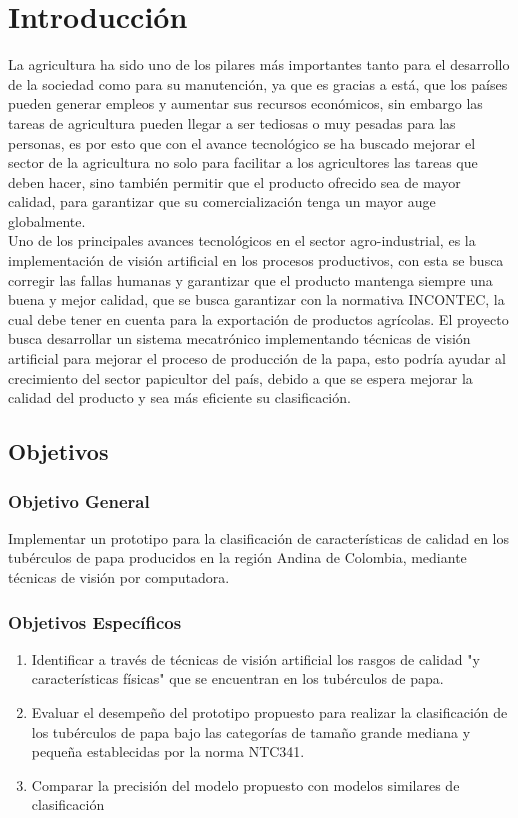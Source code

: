\cleardoublepage %

\chapter{Introducción}

La agricultura ha sido uno de los pilares más importantes tanto para el desarrollo de la sociedad como para su manutención, ya que es gracias a está, que los países pueden generar empleos y aumentar sus recursos económicos, sin embargo las tareas de agricultura pueden llegar a ser tediosas o muy pesadas para las personas, es por esto que con el avance tecnológico se ha buscado mejorar el sector de la agricultura no solo para facilitar a los agricultores las tareas que deben hacer, sino también permitir que el producto ofrecido sea de mayor calidad, para garantizar que su comercialización tenga un mayor auge globalmente.\\

Uno de los principales avances tecnológicos en el sector agro-industrial, es la implementación de visión artificial en los procesos productivos, con esta se busca corregir las fallas humanas y garantizar que el producto mantenga siempre una buena y mejor calidad, que se busca garantizar con la normativa INCONTEC, la cual debe tener en cuenta para la exportación de productos agrícolas. El proyecto busca desarrollar un sistema mecatrónico implementando técnicas de visión artificial para mejorar el proceso de producción de la papa, esto podría ayudar al crecimiento del sector papicultor del país, debido a que se espera mejorar la calidad del producto y sea más eficiente su clasificación.


\newpage
\section{Objetivos}

\subsection{Objetivo General}

Implementar un prototipo para la clasificación de características de calidad en los tubérculos de papa producidos en la región Andina de Colombia, mediante técnicas de visión por computadora.

\subsection{Objetivos Específicos}
\begin{enumerate}
	\item Identificar a través de técnicas de visión artificial los rasgos de calidad "y características físicas" que se encuentran en los tubérculos de papa. 
	\item Evaluar el desempeño del prototipo propuesto para realizar la clasificación de los tubérculos de papa bajo las categorías de tamaño grande mediana y pequeña establecidas por la norma NTC341. 
	\item Comparar la precisión del modelo propuesto con modelos similares de clasificación
\end{enumerate}

